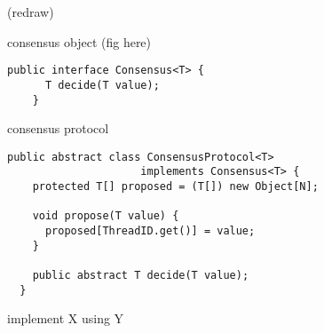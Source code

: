 \begin{frame}{}

  (redraw)
\end{frame}

\begin{frame}[fragile]{}
  consensus object (fig here)

  \begin{lstlisting}[style = JavaStyle]
    public interface Consensus<T> {
      T decide(T value);
    }
  \end{lstlisting}
\end{frame}

\begin{frame}[fragile]{}
  consensus protocol

  \begin{lstlisting}[style = JavaStyle]
  public abstract class ConsensusProtocol<T> 
                     implements Consensus<T> {
    protected T[] proposed = (T[]) new Object[N];
  
    void propose(T value) {
      proposed[ThreadID.get()] = value;
    }
  
    public abstract T decide(T value);
  }
  \end{lstlisting}
\end{frame}

\begin{frame}{}
  implement X using Y
\end{frame}
